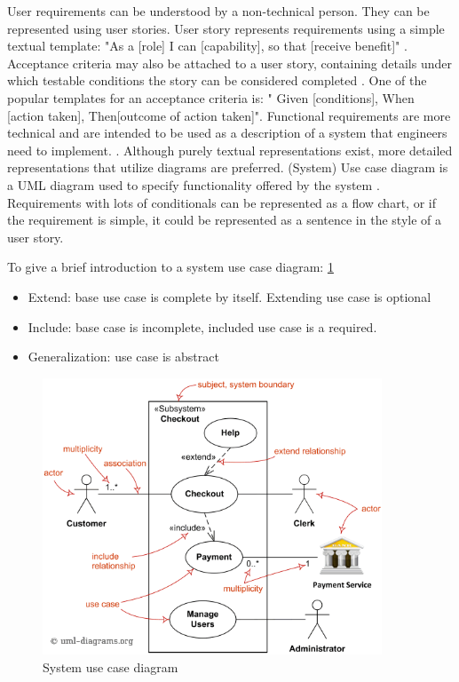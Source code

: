 User requirements can be understood by a non-technical person. They can be represented using user stories. User story represents requirements using a simple textual template: "As a [role] I can [capability], so that [receive benefit]" \cite{userStories}. Acceptance criteria may also be attached to a user story, containing details under which testable conditions the story can be considered completed \cite{Kannan2019User}. One of the popular templates for an acceptance criteria is: " Given [conditions], When [action taken], Then[outcome of action taken]". 
Functional requirements are more technical and are intended to be used as a description of a system that engineers need to implement. \cite{wiegers2013software}. Although purely textual representations exist, more detailed representations that utilize diagrams are preferred. (System) Use case diagram is a UML diagram used to specify functionality offered by the system \cite{malan2001functional}. Requirements with lots of conditionals can be represented as a flow chart, or if the requirement is simple, it could be represented as a sentence in the style of a user story. 

To give a brief introduction to a system use case diagram: \ref{fig:useCase}
\begin{itemize}
    \item Extend: base use case is complete by itself. Extending use case is optional
    \item Include: base case is incomplete, included use case is a required.
    \item Generalization: use case is abstract
\end{itemize}
\begin{figure}
    
    \centering
    \includegraphics[width=0.9\textwidth,keepaspectratio]{../images/use-case-diagram-elements.png}
    \caption{System use case diagram}
    \label{fig:useCase}
\end{figure}

